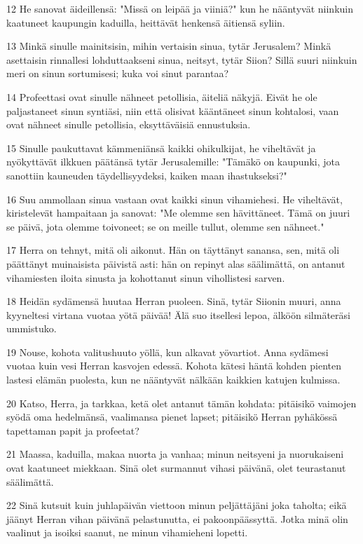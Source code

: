 \par 12 He sanovat äideillensä: "Missä on leipää ja viiniä?" kun he nääntyvät niinkuin kaatuneet kaupungin kaduilla, heittävät henkensä äitiensä syliin.
\par 13 Minkä sinulle mainitsisin, mihin vertaisin sinua, tytär Jerusalem? Minkä asettaisin rinnallesi lohduttaakseni sinua, neitsyt, tytär Siion? Sillä suuri niinkuin meri on sinun sortumisesi; kuka voi sinut parantaa?
\par 14 Profeettasi ovat sinulle nähneet petollisia, äiteliä näkyjä. Eivät he ole paljastaneet sinun syntiäsi, niin että olisivat kääntäneet sinun kohtalosi, vaan ovat nähneet sinulle petollisia, eksyttäväisiä ennustuksia.
\par 15 Sinulle paukuttavat kämmeniänsä kaikki ohikulkijat, he viheltävät ja nyökyttävät ilkkuen päätänsä tytär Jerusalemille: "Tämäkö on kaupunki, jota sanottiin kauneuden täydellisyydeksi, kaiken maan ihastukseksi?"
\par 16 Suu ammollaan sinua vastaan ovat kaikki sinun vihamiehesi. He viheltävät, kiristelevät hampaitaan ja sanovat: "Me olemme sen hävittäneet. Tämä on juuri se päivä, jota olemme toivoneet; se on meille tullut, olemme sen nähneet."
\par 17 Herra on tehnyt, mitä oli aikonut. Hän on täyttänyt sanansa, sen, mitä oli päättänyt muinaisista päivistä asti: hän on repinyt alas säälimättä, on antanut vihamiesten iloita sinusta ja kohottanut sinun vihollistesi sarven.
\par 18 Heidän sydämensä huutaa Herran puoleen. Sinä, tytär Siionin muuri, anna kyyneltesi virtana vuotaa yötä päivää! Älä suo itsellesi lepoa, älköön silmäteräsi ummistuko.
\par 19 Nouse, kohota valitushuuto yöllä, kun alkavat yövartiot. Anna sydämesi vuotaa kuin vesi Herran kasvojen edessä. Kohota kätesi häntä kohden pienten lastesi elämän puolesta, kun ne nääntyvät nälkään kaikkien katujen kulmissa.
\par 20 Katso, Herra, ja tarkkaa, ketä olet antanut tämän kohdata: pitäisikö vaimojen syödä oma hedelmänsä, vaalimansa pienet lapset; pitäisikö Herran pyhäkössä tapettaman papit ja profeetat?
\par 21 Maassa, kaduilla, makaa nuorta ja vanhaa; minun neitsyeni ja nuorukaiseni ovat kaatuneet miekkaan. Sinä olet surmannut vihasi päivänä, olet teurastanut säälimättä.
\par 22 Sinä kutsuit kuin juhlapäivän viettoon minun peljättäjäni joka taholta; eikä jäänyt Herran vihan päivänä pelastunutta, ei pakoonpäässyttä. Jotka minä olin vaalinut ja isoiksi saanut, ne minun vihamieheni lopetti.

